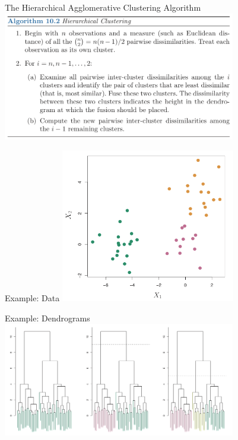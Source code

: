 \documentclass[serif,xcolor=pdftex,dvipsnames,table,hyperref={bookmarks=false,breaklinks}]{beamer}
\begin{document}
\begin{frame}[t]{The Hierarchical Agglomerative Clustering Algorithm}
\center
\includegraphics[width=4in]{../Figures/hac_algorithm.png}
\end{frame}

\begin{frame}[t]{Example: Data}
\center
\includegraphics[width=3in]{../Figures/hac_example_data.png}
\end{frame}

\begin{frame}[t]{Example: Dendrograms}
\center
\includegraphics[width=4in]{../Figures/hac_example.png}
\end{frame}
\end{document}
